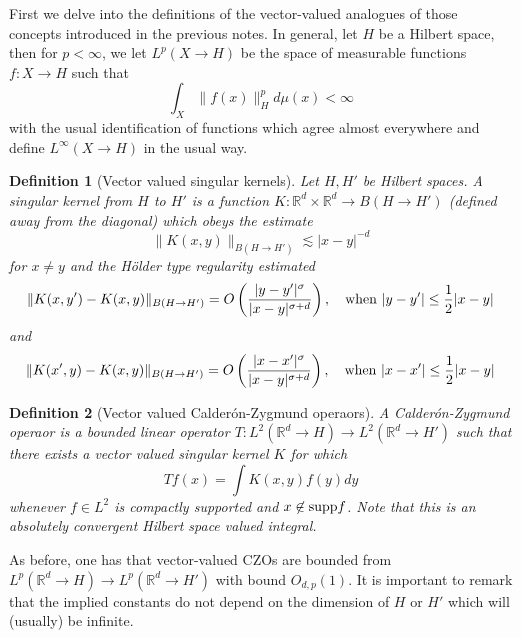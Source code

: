\documentclass[11pt]{article}
\newtheorem*{defn}{Definition}
\theoremstyle{remark}
\newcommand{\1}{\textbf{1}}
\newcommand{\lle}{\lesssim}
\def\norm#1{\| #1  \|}
\newcommand{\bbR}{\mathbb{R}}
\begin{document}
First we delve into the definitions of the vector-valued analogues of those concepts introduced in the previous notes. In general, let $H$ be a Hilbert space, then for $p < \infty$, we let $L^p(X \to H)$ be the space of measurable functions $f:X \to H$ such that
\[
\int_X \norm{f(x)}^p_{H} d\mu(x) < \infty
\]
with the usual identification of functions which agree almost everywhere and define $L^\infty(X \to H)$ in the usual way.
\begin{defn}[Vector valued singular kernels] Let $H, H'$ be Hilbert spaces. A singular kernel from $H$ to $H'$ is a function $K: \bbR^d \times \bbR^d \to B(H\to H')$ (defined away from the diagonal) which obeys the estimate
\[
\norm{K(x,y)}_{B(H \to H')} \lle |x-y|^{-d}
\]
for $x \neq y$ and the H\"older type regularity estimated
\[
\norm{K(x,y') - K(x,y)}_{B(H \to H')} = O \left( \frac{|y-y'|^\sigma}{|x-y|^{\sigma+d}} \right), \quad \textup{when } |y-y'| \leq \frac{1}{2} |x-y|
\]
and
\[
\norm{K(x',y) - K(x,y)}_{B(H \to H')} = O \left( \frac{|x-x'|^\sigma}{|x-y|^{\sigma+d}} \right), \quad \textup{when } |x-x'| \leq \frac{1}{2} |x-y|
\]
\end{defn}
\begin{defn}[Vector valued Calder\'on-Zygmund operaors]
A Calder\'on-Zygmund operaor is a bounded linear operator $T : L^2(\bbR^d \to H) \to L^2(\bbR^d \to H')$ such that there exists a vector valued singular kernel $K$ for which
\[
Tf(x) = \int K(x,y) f(y) dy
\]
whenever $f \in L^2$ is compactly supported and $x \not\in \textup{supp} f$. Note that this is an absolutely convergent Hilbert space valued integral.
\end{defn}
As before, one has that vector-valued CZOs are bounded from $ L^p(\bbR^d \to H) \to L^p(\bbR^d \to H')$ with bound $O_{d,p}(1)$. It is important to remark that the implied constants do not depend on the dimension of $H$ or $H'$ which will (usually) be infinite.
\end{document}
